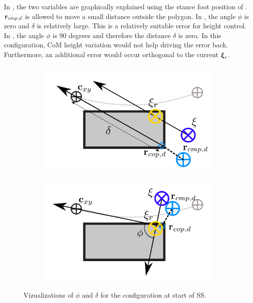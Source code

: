In , the two variables are graphically explained using the stance foot position of . $\mathbf{r}_{cmp,d}$ is allowed to move a small distance outside the polygon. In , the angle $\phi$ is zero and $\delta$ is relatively large. This is a relatively suitable error for height control. In , the angle $\phi$ is $90$ degrees and therefore the distance $\delta$ is zero. In this configuration, \ac{CoM} height variation would not help driving the error back. Furthermore, an additional error would occur orthogonal to the current $\boldsymbol{\xi}_e$.
\begin{figure}[h]
\centering
  \begin{subfigure}{0.49\textwidth}
    \centering
  \includegraphics[width=.7\linewidth]{STYLESTUFF/ICPplanStartSSPhiViz0.png}
    \caption{}
     \label{fig:phiVizc}
  \end{subfigure}
  \begin{subfigure}{0.49\textwidth}
    \centering
  \includegraphics[width=.7\linewidth]{STYLESTUFF/ICPplanStartSSPhiViz90.png}
    \caption{}
     \label{fig:phiVizd}
  \end{subfigure}
  \caption{Vizualizations of $\phi$ and $\delta$ for the configuration at start of \ac{SS}.}
  \label{fig:phiViz}
\end{figure}

